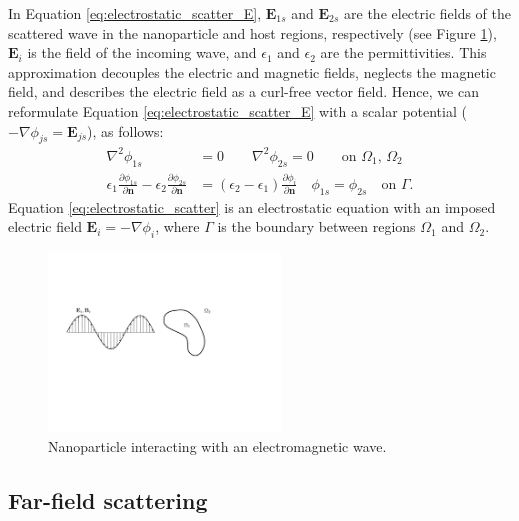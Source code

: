 In Equation \eqref{eq:electrostatic_scatter_E}, $\mathbf{E}_{1s}$ and $\mathbf{E}_{2s}$ 
are the electric fields of the scattered wave in the nanoparticle and host regions, respectively 
(see Figure \ref{fig:part_wave}), 
$\mathbf{E}_{i}$ is the field of the incoming wave, and $\epsilon_1$ 
and $\epsilon_2$ are the permittivities.
This approximation decouples the electric and magnetic fields, neglects the magnetic field, 
and describes the electric field as a curl-free vector field.
Hence, we can reformulate Equation \eqref{eq:electrostatic_scatter_E} with a scalar potential
($-\nabla \phi_{js} = \mathbf{E}_{js}$), as follows:
%
\begin{align} \label{eq:electrostatic_scatter}
\nabla^2 \phi_{1s} &= 0 \qquad \nabla^2 \phi_{2s} = 0 \qquad\text{on $\Omega_1$, $\Omega_2$} \nonumber \\
\epsilon_1\frac{\partial\phi_{1s}}{\partial \mathbf{n}} - \epsilon_2\frac{\partial\phi_{2s}}{\partial\mathbf{n}} &= (\epsilon_2-\epsilon_1)\frac{\partial\phi_i}{\partial\mathbf{n}} \quad \phi_{1s} = \phi_{2s} \quad \text{on $\Gamma$}.
\end{align}
%
Equation \eqref{eq:electrostatic_scatter} is an electrostatic equation 
with an imposed electric field $\mathbf{E}_i=-\nabla\phi_i$, where $\Gamma$ 
is the boundary between regions $\Omega_1$ and $\Omega_2$.

\begin{figure}%
   \centering
   \includegraphics[width=0.55\textwidth]{particle_wave.pdf} 
   \caption{Nanoparticle interacting with an electromagnetic wave.}
   \label{fig:part_wave}
\end{figure}

\subsection{Far-field scattering} \label{sec:ff_scattering}

